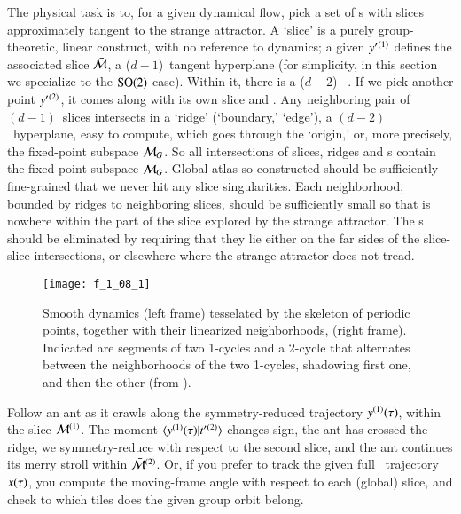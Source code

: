 The physical task is to, for a given dynamical flow, pick a set of
{\template s} with slices approximately tangent to the strange attractor.
A `slice' is a purely group-theoretic, linear construct, with no
reference to dynamics; a given {\template} ${y'}{}^{(1)}$ defines the
associated slice $\bar{\cal M}$, a ($d\!-\!1$)\dmn\ tangent hyperplane (for
simplicity, in this section we specialize to the $\textrm{SO}(2)$ case). Within
it, there is a ($d\!-\!2$)\dmn\ {\sset} . If we pick
another {\template} point ${y'}{}^{(2)}$, it comes along with its own
slice and {\sset}. Any neighboring pair of $(d\!-\!1)$\dmn\ slices
intersects in a `ridge' (`boundary,' `edge'), a $(d\!-\!2)$\dmn\
hyperplane, easy to compute, which goes through the `origin,' or, more
precisely, the fixed-point subspace  ${\cal M}_{G}$. So all intersections
of slices, ridges and {\sset s} contain the fixed-point subspace
${\cal M}_{G}$. Global atlas so constructed should be sufficiently
fine-grained that we never hit any slice singularities. Each
neighborhood, bounded by ridges to neighboring slices, should be
sufficiently small so that {\sset} is nowhere within the part of the
slice explored by the strange attractor. The {\sset}s should be
eliminated by requiring that they lie either on the far sides of the
slice-slice intersections, or elsewhere where the strange attractor does
not tread.




 \begin{figure}
 \begin{center}
\texttt{[image: f\_1\_08\_1]}
 \end{center}
 \caption{\label{fig:Tesselate}
Smooth dynamics  (left frame) tesselated by the skeleton of periodic
points, together with their linearized neighborhoods, (right frame).
Indicated are segments of two 1-cycles and a 2-cycle that alternates
between the neighborhoods of the two 1-cycles, shadowing first one, and
then the other
(from \wwwcb{}).
  }\end{figure}
%



Follow an ant as it crawls along the symmetry-reduced trajectory
$y{}^{(1)}(\tau)$, within the slice $\bar{\cal M}{}^{(1)}$. The moment
$\braket{\sspRed{}^{(1)}(\tau)}{\sliceTan{}{}^{(2)}}$ changes sign, the
ant has crossed the ridge, we symmetry-reduce with respect to the second
slice, and the ant continues its merry stroll within $\bar{\cal M}{}^{(2)}$.
Or, if you prefer to track the  given full \statesp\ trajectory
$x(\tau)$, you compute the moving-frame angle with respect to each
(global) slice, and check to which tiles does the given group orbit
belong.


